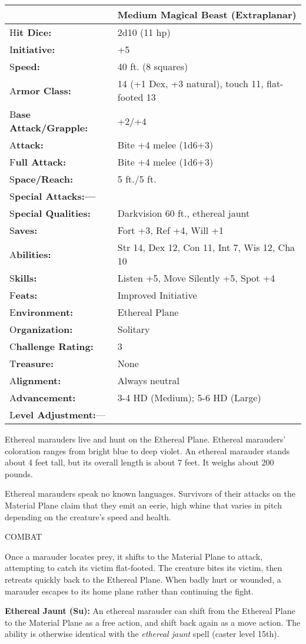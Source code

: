 \documentclass{article}
\begin{document}
\begin{tabular}{|>{\raggedright}p{91pt}|>{\raggedright}p{193pt}|}
\hline
  & Medium Magical Beast (Extraplanar)\tabularnewline
\hline
H\textbf{it Dice:} & 2d10 (11 hp)\tabularnewline
\hline
I\textbf{nitiative:} & +5\tabularnewline
\hline
S\textbf{peed:} & 40 ft. (8 squares)\tabularnewline
\hline
A\textbf{rmor Class:} & 14 (+1 Dex, +3 natural), touch 11, flat-footed 13\tabularnewline
\hline
B\textbf{ase Attack/Grapple:} & +2/+4\tabularnewline
\hline
A\textbf{ttack:} & Bite +4 melee (1d6+3)\tabularnewline
\hline
F\textbf{ull Attack:} & Bite +4 melee (1d6+3)\tabularnewline
\hline
S\textbf{pace/Reach:} & 5 ft./5 ft.\tabularnewline
\hline
S\textbf{pecial Attacks:---} & \tabularnewline
\hline
S\textbf{pecial Qualities:} & Darkvision 60 ft., ethereal jaunt\tabularnewline
\hline
S\textbf{aves:} & Fort +3, Ref +4, Will +1\tabularnewline
\hline
A\textbf{bilities:} & Str 14, Dex 12, Con 11, Int 7, Wis 12, Cha 10\tabularnewline
\hline
S\textbf{kills:} & Listen +5, Move Silently +5, Spot +4\tabularnewline
\hline
F\textbf{eats:} & Improved Initiative\tabularnewline
\hline
E\textbf{nvironment:} & Ethereal Plane\tabularnewline
\hline
O\textbf{rganization:} & Solitary\tabularnewline
\hline
C\textbf{hallenge Rating:} & 3\tabularnewline
\hline
T\textbf{reasure:} & None\tabularnewline
\hline
A\textbf{lignment:} & Always neutral\tabularnewline
\hline
A\textbf{dvancement:} & 3-4 HD (Medium); 5-6 HD (Large)\tabularnewline
\hline
L\textbf{evel Adjustment:}--- & \tabularnewline
\hline
\end{tabular}

Ethereal marauders live and hunt on the Ethereal Plane. Ethereal marauders' coloration 
ranges from bright blue to deep violet. An ethereal marauder stands about 4 feet 
tall, but its overall length is about 7 feet. It weighs about 200 pounds.

Ethereal marauders speak no known languages. Survivors of their attacks on the 
Material Plane claim that they emit an eerie, high whine that varies in pitch depending 
on the creature's speed and health.

COMBAT

Once a marauder locates prey, it shifts to the Material Plane to attack, attempting 
to catch its victim flat-footed. The creature bites its victim, then retreats quickly 
back to the Ethereal Plane. When badly hurt or wounded, a marauder escapes to its 
home plane rather than continuing the fight.

\textbf{Ethereal Jaunt (Su):} An ethereal marauder can shift from the Ethereal 
Plane to the Material Plane as a free action, and shift back again as a move action. 
The ability is otherwise identical with the \textit{ethereal jaunt }spell (caster 
level 15th).
\end{document}

